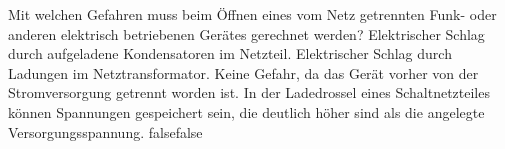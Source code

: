     {Mit welchen Gefahren muss beim Öffnen eines vom Netz getrennten Funk- oder anderen elektrisch betriebenen Gerätes gerechnet werden?}
    {Elektrischer Schlag durch aufgeladene Kondensatoren im Netzteil.}
    {Elektrischer Schlag durch Ladungen im Netztransformator.}
    {Keine Gefahr, da das Gerät vorher von der Stromversorgung getrennt worden ist.}
    {In der Ladedrossel eines Schaltnetzteiles können Spannungen gespeichert sein, die deutlich höher sind als die angelegte Versorgungsspannung.}
    {false}{false}